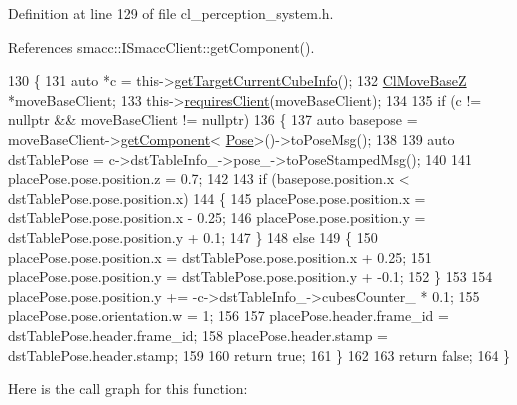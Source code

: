 Definition at line 129 of file cl\+\_\+perception\+\_\+system.\+h.



References smacc\+::\+I\+Smacc\+Client\+::get\+Component().


\begin{DoxyCode}
130             \{
131                 \textcolor{keyword}{auto} *c = this->\hyperlink{classsm__fetch__screw__loop__1_1_1cl__perception__system_1_1ClPerceptionSystem_a7db81d4aa99849818668b52aee431816}{getTargetCurrentCubeInfo}();
132                 \hyperlink{classcl__move__base__z_1_1ClMoveBaseZ}{ClMoveBaseZ} *moveBaseClient;
133                 this->\hyperlink{classsmacc_1_1ISmaccClient_a7a9990a2f3e35d547671188d69fee520}{requiresClient}(moveBaseClient);
134 
135                 \textcolor{keywordflow}{if} (c != \textcolor{keyword}{nullptr} && moveBaseClient != \textcolor{keyword}{nullptr})
136                 \{
137                     \textcolor{keyword}{auto} basepose = moveBaseClient->\hyperlink{classsmacc_1_1ISmaccClient_adef78db601749ca63c19e74a27cb88cc}{getComponent}<
      \hyperlink{classcl__move__base__z_1_1Pose}{Pose}>()->toPoseMsg();
138 
139                     \textcolor{keyword}{auto} dstTablePose = c->dstTableInfo\_->pose\_->toPoseStampedMsg();
140 
141                     placePose.pose.position.z = 0.7;
142 
143                     \textcolor{keywordflow}{if} (basepose.position.x < dstTablePose.pose.position.x)
144                     \{
145                         placePose.pose.position.x = dstTablePose.pose.position.x - 0.25;
146                         placePose.pose.position.y = dstTablePose.pose.position.y + 0.1;
147                     \}
148                     \textcolor{keywordflow}{else}
149                     \{
150                         placePose.pose.position.x = dstTablePose.pose.position.x + 0.25;
151                         placePose.pose.position.y = dstTablePose.pose.position.y + -0.1;
152                     \}
153 
154                     placePose.pose.position.y += -c->dstTableInfo\_->cubesCounter\_ * 0.1;
155                     placePose.pose.orientation.w = 1;
156 
157                     placePose.header.frame\_id = dstTablePose.header.frame\_id;
158                     placePose.header.stamp = dstTablePose.header.stamp;
159 
160                     \textcolor{keywordflow}{return} \textcolor{keyword}{true};
161                 \}
162 
163                 \textcolor{keywordflow}{return} \textcolor{keyword}{false};
164             \}
\end{DoxyCode}
Here is the call graph for this function\+:
